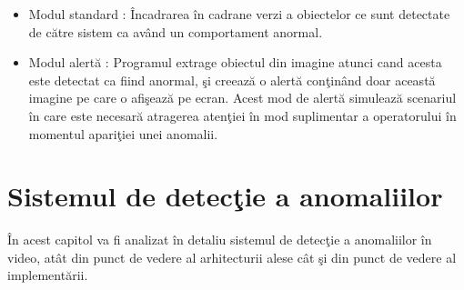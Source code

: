 \documentclass[a4paper,12pt]{report}
\begin{document}
\begin{itemize}
\item Modul standard : Încadrarea în cadrane verzi a obiectelor ce sunt detectate de către sistem ca având un comportament anormal. 
\item Modul alertă : Programul extrage obiectul din imagine atunci cand acesta este detectat ca fiind anormal, şi creează o alertă conţinând doar această imagine pe care o afişează pe ecran. Acest mod de alertă simulează scenariul în care este necesară atragerea atenţiei în mod suplimentar a operatorului în momentul apariţiei unei anomalii.  
\end{itemize}

\chapter{Sistemul de detecţie a anomaliilor}
\quad În acest capitol va fi analizat în detaliu sistemul de detecţie a anomaliilor în video, atât din punct de vedere al arhitecturii alese cât şi din punct de vedere al implementării.
\end{document}
